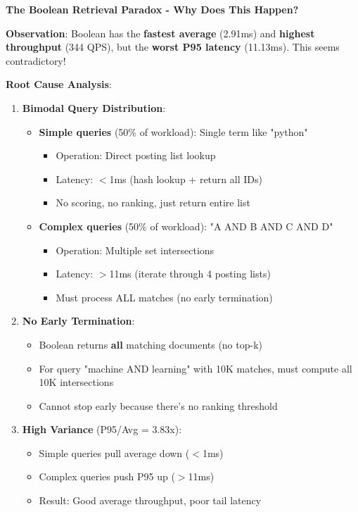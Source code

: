 \documentclass[12pt,a4paper]{article}
\begin{document}
\textbf{The Boolean Retrieval Paradox - Why Does This Happen?}

\textbf{Observation}: Boolean has the \textbf{fastest average} (2.91ms) and \textbf{highest throughput} (344 QPS), but the \textbf{worst P95 latency} (11.13ms). This seems contradictory!

\textbf{Root Cause Analysis}:

\begin{enumerate}
    \item \textbf{Bimodal Query Distribution}:
    \begin{itemize}
        \item \textbf{Simple queries} (50\% of workload): Single term like "python"
        \begin{itemize}
            \item Operation: Direct posting list lookup
            \item Latency: $<$1ms (hash lookup + return all IDs)
            \item No scoring, no ranking, just return entire list
        \end{itemize}
        \item \textbf{Complex queries} (50\% of workload): "A AND B AND C AND D"
        \begin{itemize}
            \item Operation: Multiple set intersections
            \item Latency: $>$11ms (iterate through 4 posting lists)
            \item Must process ALL matches (no early termination)
        \end{itemize}
    \end{itemize}
    
    \item \textbf{No Early Termination}:
    \begin{itemize}
        \item Boolean returns \textbf{all} matching documents (no top-k)
        \item For query "machine AND learning" with 10K matches, must compute all 10K intersections
        \item Cannot stop early because there's no ranking threshold
    \end{itemize}
    
    \item \textbf{High Variance} (P95/Avg = 3.83x):
    \begin{itemize}
        \item Simple queries pull average down ($<$1ms)
        \item Complex queries push P95 up ($>$11ms)
        \item Result: Good average throughput, poor tail latency
    \end{itemize}
\end{enumerate}
\end{document}
